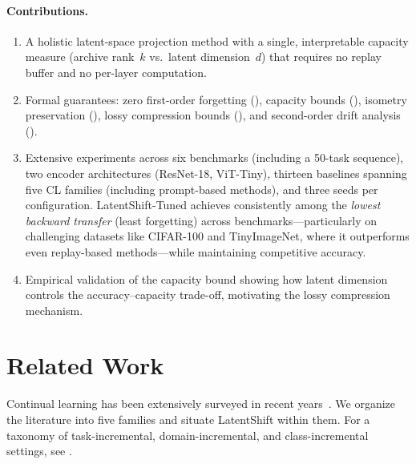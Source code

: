 \documentclass{article}
\begin{document}
\paragraph{Contributions.}
\begin{enumerate}
    \item A holistic latent-space projection method with a single, interpretable
          capacity measure (archive rank~$k$ vs.\ latent dimension~$d$)
          that requires no replay buffer and no per-layer computation.
    \item Formal guarantees: zero first-order forgetting (),
          capacity bounds (), isometry preservation
          (), lossy compression bounds
          (), and second-order drift analysis
          ().
    \item Extensive experiments across six benchmarks (including a 50-task
          sequence), two encoder architectures (ResNet-18, ViT-Tiny), thirteen
          baselines spanning five CL families (including prompt-based methods),
          and three seeds per
          configuration. LatentShift-Tuned achieves consistently among the \emph{lowest backward
          transfer} (least forgetting) across benchmarks---particularly on
          challenging datasets like CIFAR-100 and TinyImageNet, where it
          outperforms even replay-based methods---while maintaining
          competitive accuracy.
    \item Empirical validation of the capacity bound showing how latent
          dimension controls the accuracy--capacity trade-off, motivating
          the lossy compression mechanism.
\end{enumerate}

\section{Related Work}
\label{sec:related}

Continual learning has been extensively surveyed in recent
years~\citep{parisi2019continual,delange2021continual,wang2024comprehensive}.
We organize the literature into five families and situate LatentShift within
them. For a taxonomy of task-incremental, domain-incremental, and
class-incremental settings, see \citet{vandeven2022three}.
\end{document}
